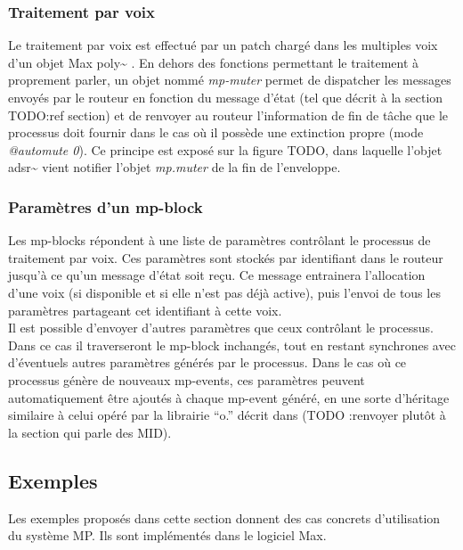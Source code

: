 \subsubsection{Traitement par voix}

\noindent Le traitement par voix est effectué par un patch chargé dans les multiples voix d'un objet Max poly\textasciitilde{ }. En dehors des fonctions permettant le traitement à proprement parler, un objet nommé \textit{mp-muter} permet de dispatcher les messages envoyés par le routeur en fonction du message d'état (tel que décrit à la section TODO:ref section) et de renvoyer au routeur l'information de fin de tâche que le processus doit fournir dans le cas où il possède une extinction propre (mode \textit{@automute 0}). Ce principe est exposé sur la figure TODO, dans laquelle l'objet adsr\textasciitilde{ } vient notifier l'objet \textit{mp.muter} de la fin de l'enveloppe.

\subsubsection{Paramètres d'un mp-block}

\noindent Les mp-blocks répondent à une liste de paramètres contrôlant le processus de traitement par voix. Ces paramètres sont stockés par identifiant dans le routeur jusqu'à ce qu'un message d'état soit reçu. Ce message entrainera l'allocation d'une voix (si disponible et si elle n'est pas déjà active), puis l'envoi de tous les paramètres partageant cet identifiant à cette voix.\\
 \indent Il est possible d'envoyer d'autres paramètres que ceux contrôlant le processus. Dans ce cas il traverseront le mp-block inchangés, tout en restant synchrones avec d'éventuels autres paramètres générés par le processus. Dans le cas où ce processus génère de nouveaux mp-events, ces paramètres peuvent automatiquement être ajoutés à chaque mp-event généré, en une sorte d'héritage similaire à celui opéré par la librairie ``o.'' décrit dans \cite{goudard_dynamic_2011} (TODO :renvoyer plutôt à la section qui parle des MID).


\subsection{Exemples}

\noindent Les exemples proposés dans cette section donnent des cas concrets d'utilisation du système MP. Ils sont implémentés dans le logiciel Max.

